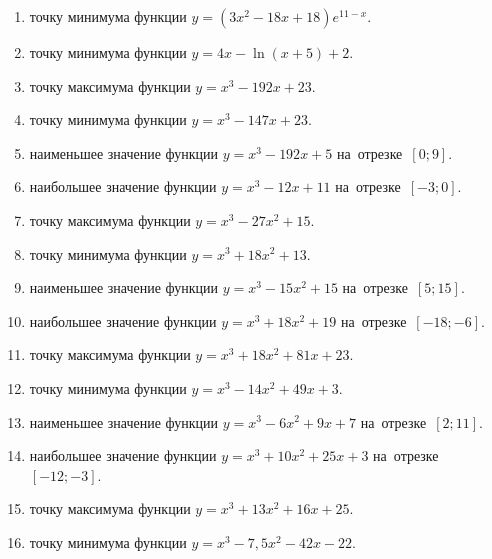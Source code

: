 \documentclass[a4paper,10pt]{article}
\begin{document}
\begin{enumerate}
\item {} точку минимума функции $y=\left(3x^2-18x+18\right){{e}^{11-x}}$.

\item {} точку минимума функции $y=4x-\ln \left(x+5\right)+2$.

\item {} точку максимума функции $y=x^3 -192x +23$.

\item {} точку минимума функции $y=x^3 -147x+23$.

\item {} наименьшее значение функции $y=x^3 -192x+5$ на~отрезке~$\left[0;9\right]$.

\item {} наибольшее значение функции $y=x^3 -12x+11$ на~отрезке~$\left[-3;0\right]$.

\item {} точку максимума функции $y=x^3 -27x^2+15$.

\item {} точку минимума функции $y=x^3 +18x^2+13$.

\item {} наименьшее значение функции $y=x^3 -15x^2+15$ на~отрезке~$\left[5;15\right]$.

\item {} наибольшее значение функции $y=x^3 +18x^2+19$ на~отрезке~$\left[-18;-6\right]$.

\item {} точку максимума функции $y=x^3 +18x^2+81x+23$.

\item {} точку минимума функции $y=x^3 -14x^2+49x+3$.

\item {} наименьшее значение функции $y=x^3 -6x^2+9x+7$ на~отрезке~$\left[2;11\right]$.

\item {} наибольшее значение функции $y=x^3 +10x^2+25x+3$ на~отрезке~$\left[-12;-3\right]$.

\item {} точку максимума функции $y=x^3 +13x^2+16x+25$.

\item {} точку минимума функции $y=x^3 -7,5x^2-42x-22$.


\end{enumerate}
\end{document}
